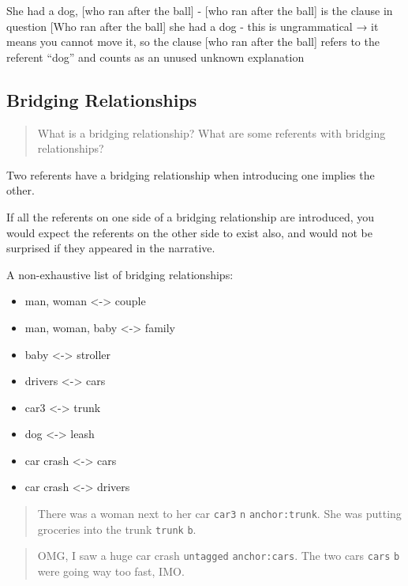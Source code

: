 \documentclass[
]{book}
\providecommand{\tightlist}{%
  \setlength{\itemsep}{0pt}\setlength{\parskip}{0pt}}
\begin{document}
She had a dog, {[}who ran after the ball{]} - {[}who ran after the ball{]} is the clause in question
{[}Who ran after the ball{]} she had a dog - this is ungrammatical → it means you cannot move it, so the clause {[}who ran after the ball{]} refers to the referent ``dog'' and counts as an unused unknown explanation

\hypertarget{bridging-relationships}{%
\subsection{Bridging Relationships}\label{bridging-relationships}}

\begin{quote}
What is a bridging relationship?
What are some referents with bridging relationships?
\end{quote}

Two referents have a bridging relationship
when introducing one implies the other.

If all the referents on one side of a bridging relationship are introduced,
you would expect the referents on the other side to exist also,
and would not be surprised if they appeared in the narrative.

A non-exhaustive list of bridging relationships:

\begin{itemize}
\tightlist
\item
  man, woman \textless-\textgreater{} couple
\item
  man, woman, baby \textless-\textgreater{} family
\item
  baby \textless-\textgreater{} stroller
\item
  drivers \textless-\textgreater{} cars
\item
  car3 \textless-\textgreater{} trunk
\item
  dog \textless-\textgreater{} leash
\item
  car crash \textless-\textgreater{} cars
\item
  car crash \textless-\textgreater{} drivers
\end{itemize}

\begin{quote}
There was a woman next to her car \texttt{car3} \texttt{n} \texttt{anchor:trunk}.
She was putting groceries into the trunk \texttt{trunk} \texttt{b}.
\end{quote}

\begin{quote}
OMG, I saw a huge car crash \texttt{untagged} \texttt{anchor:cars}.
The two cars \texttt{cars} \texttt{b} were going way too fast, IMO.
\end{quote}
\end{document}
